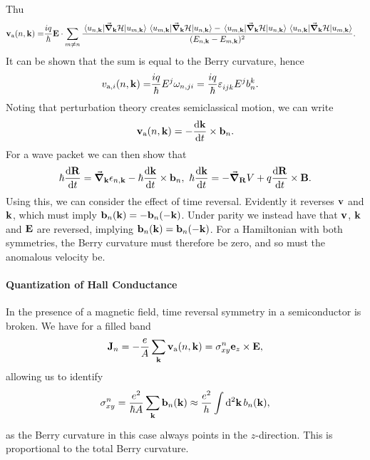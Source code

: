 Thu
\begin{align*}
	\vb{v}_{\text{a}}(n, \vb{k}) =& \frac{iq}{\hbar}\vb{E}\cdot\sum\limits_{m\neq n}\frac{\mel{u_{n, \vb{k}}}{\grad_{\vb{k}}\ensuremath{\mathcal{H}}}{u_{m, \vb{k}}}\mel{u_{m, \vb{k}}}{\grad_{\vb{k}}\ensuremath{\mathcal{H}}}{u_{n, \vb{k}}} - \mel{u_{m, \vb{k}}}{\grad_{\vb{k}}\ensuremath{\mathcal{H}}}{u_{n, \vb{k}}}\mel{u_{n, \vb{k}}}{\grad_{\vb{k}}\ensuremath{\mathcal{H}}}{u_{m, \vb{k}}}}{(E_{n, \vb{k}} - E_{m, \vb{k}})^{2}}.
\end{align*}
It can be shown that the sum is equal to the Berry curvature, hence
\begin{align*}
	v_{\text{a}, i}(n, \vb{k}) =& \frac{iq}{\hbar}E^{j}\omega_{n, ji} = \frac{iq}{\hbar}\leci{}{ijk}E^{j}b_{n}^{k}.
\end{align*}
Noting that perturbation theory creates semiclassical motion, we can write
\begin{align*}
	\vb{v}_{\text{a}}(n, \vb{k}) = -\dv{\vb{k}}{t}\times\vb{b}_{n}.
\end{align*}
For a wave packet we can then show that
\begin{align*}
	\hbar\dv{\vb{R}}{t} = \grad_{\vb{k}}\epsilon_{n, \vb{k}} - \hbar\dv{\vb{k}}{t}\times\vb{b}_{n},\ \hbar\dv{\vb{k}}{t} = -\grad_{\vb{R}}V + q\dv{\vb{R}}{t}\times\vb{B}.
\end{align*}
Using this, we can consider the effect of time reversal. Evidently it reverses $\vb{v}$ and $\vb{k}$, which must imply $\vb{b}_{n}(\vb{k}) = -\vb{b}_{n}(-\vb{k})$. Under parity we instead have that $\vb{v}$, $\vb{k}$ and $\vb{E}$ are reversed, implying $\vb{b}_{n}(\vb{k}) = \vb{b}_{n}(-\vb{k})$. For a Hamiltonian with both symmetries, the Berry curvature must therefore be zero, and so must the anomalous velocity be.

\paragraph{Quantization of Hall Conductance}
In the presence of a magnetic field, time reversal symmetry in a semiconductor is broken. We have for a filled band
\begin{align*}
	\vb{J}_{n} = -\frac{e}{A}\sum\limits_{\vb{k}}\vb{v}_{\text{a}}(n, \vb{k}) = \sigma_{xy}^{n}\vb{e}_{z}\times\vb{E},
\end{align*}
allowing us to identify
\begin{align*}
	\sigma_{xy}^{n} = \frac{e^{2}}{\hbar A}\sum\limits_{\vb{k}}\vb{b}_{n}(\vb{k}) \approx \frac{e^{2}}{h}\int\limits_{}^{}\dd[2]{\vb{k}}b_{n}(\vb{k}),
\end{align*}
as the Berry curvature in this case always points in the $z$-direction. This is proportional to the total Berry curvature.


